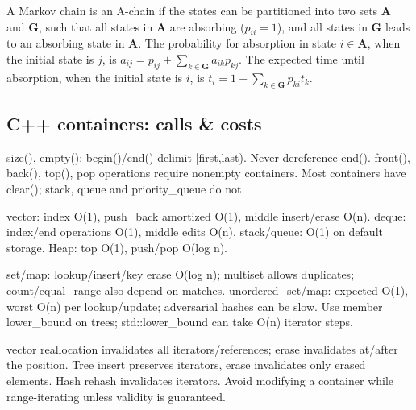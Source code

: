 \begin{multicols}{\Columns}
A Markov chain is an A-chain if the states can be partitioned into two sets $\mathbf{A}$ and $\mathbf{G}$, such that all states in $\mathbf{A}$ are absorbing ($p_{ii}=1$), and all states in $\mathbf{G}$ leads to an absorbing state in $\mathbf{A}$.
The probability for absorption in state $i\in\mathbf{A}$, when the initial state is $j$, is $a_{ij} = p_{ij}+\sum_{k\in\mathbf{G}} a_{ik}p_{kj}$.
The expected time until absorption, when the initial state is $i$, is $t_i = 1+\sum_{k\in\mathbf{G}}p_{ki}t_k$.

\subsection{C++ containers: calls \& costs}
 size(), empty(); begin()/end() delimit [first,last). Never dereference end(). front(), back(), top(), pop operations require nonempty containers. Most containers have clear(); stack, queue and priority\_queue do not.\par
{} vector: index O(1), push\_back amortized O(1), middle insert/erase O(n). deque: index/end operations O(1), middle edits O(n). stack/queue: O(1) on default storage. Heap: top O(1), push/pop O(log n).\par
{} set/map: lookup/insert/key erase O(log n); multiset allows duplicates; count/equal\_range also depend on matches. unordered\_set/map: expected O(1), worst O(n) per lookup/update; adversarial hashes can be slow. Use member lower\_bound on trees; std::lower\_bound can take O(n) iterator steps.\par
{} vector reallocation invalidates all iterators/references; erase invalidates at/after the position. Tree insert preserves iterators, erase invalidates only erased elements. Hash rehash invalidates iterators. Avoid modifying a container while range-iterating unless validity is guaranteed.\par

\end{multicols}
